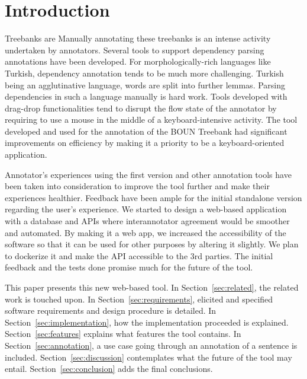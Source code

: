 \section{Introduction}
\label{sec:introduction}
Treebanks are 
Manually annotating these treebanks is an intense activity undertaken by annotators.
Several tools to support dependency parsing annotations have been developed. %
For morphologically-rich languages like Turkish, dependency annotation tends to be much more challenging.
Turkish being an agglutinative language, words are split into further lemmas.
Parsing dependencies in such a language manually is hard work.
Tools developed with drag-drop functionalities tend to disrupt the flow state of the annotator by requiring to use a mouse in the middle of a keyboard-intensive activity.
The tool developed and used for the annotation of the BOUN Treebank had significant improvements on efficiency by making it a priority to be a keyboard-oriented application.

Annotator's experiences using the first version and other annotation tools have been taken into consideration to improve the tool further and make their experiences healthier.
Feedback have been ample for the initial standalone version regarding the user's experience.
We started to design a web-based application with a database and APIs where interannotator agreement would be smoother and automated.
By making it a web app, we increased the accessibility of the software so that it can be used for other purposes by altering it slightly.
We plan to dockerize it and make the API accessible to the 3rd parties.
The initial feedback and the tests done promise much for the future of the tool.

This paper presents this new web-based tool.
In Section~\ref{sec:related}, the related work is touched upon.
In Section~\ref{sec:requirements}, elicited and specified software requirements and design procedure is detailed.
In Section~\ref{sec:implementation}, how the implementation proceeded is explained.
Section~\ref{sec:features} explains what features the tool contains.
In Section~\ref{sec:annotation}, a use case going through an annotation of a sentence is included.
Section~\ref{sec:discussion} contemplates what the future of the tool may entail.
Section~\ref{sec:conclusion} adds the final conclusions.
